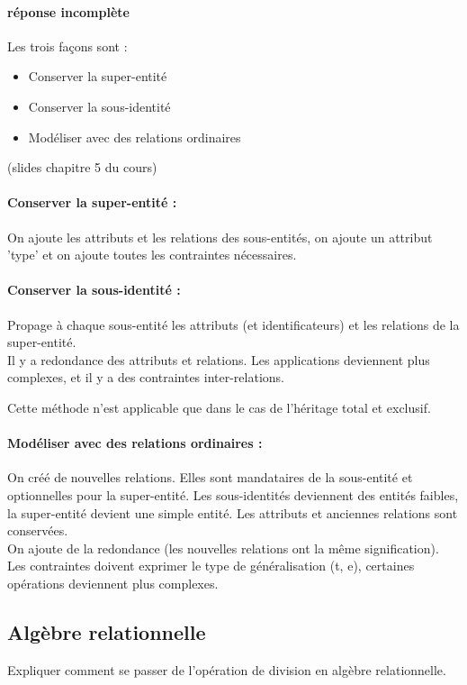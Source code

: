\paragraph{réponse incomplète}
Les trois façons sont : 
\begin{itemize}
	\item Conserver la super-entité
	\item Conserver la sous-identité 
	\item Modéliser avec des relations ordinaires
\end{itemize}
(slides chapitre 5 du cours)

\paragraph{Conserver la super-entité :}
On ajoute les attributs et les relations des sous-entités, 
on ajoute un attribut 'type' et 
on ajoute toutes les contraintes nécessaires.

\paragraph{Conserver la sous-identité :} Propage à chaque sous-entité les attributs 
(et identificateurs) et les relations de la super-entité.\\
Il y a redondance des attributs et relations. Les applications deviennent plus 
complexes, et il y a des contraintes inter-relations.

Cette méthode n'est applicable que dans le cas de l'héritage total et exclusif.

\paragraph{Modéliser avec des relations ordinaires :}
On créé de nouvelles relations. Elles sont mandataires de la sous-entité et 
optionnelles pour la super-entité.
Les sous-identités deviennent des entités faibles, la super-entité devient 
une simple entité.
Les attributs et anciennes relations sont conservées.\\

On ajoute de la redondance (les nouvelles relations ont la m\^eme signification).
Les contraintes doivent exprimer le type de généralisation (t, e), 
certaines opérations deviennent plus complexes.

\subsection{Algèbre relationnelle}
Expliquer comment se passer de l'opération de division en algèbre relationnelle.

